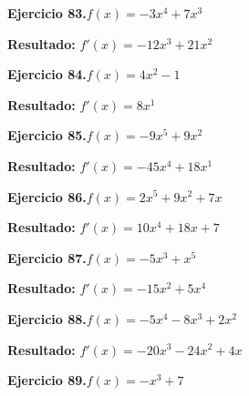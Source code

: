 \documentclass[10pt,a4paper]{article}
\begin{document}
\begin{ejbox}
\textbf{Ejercicio 83.}\quad $f(x) = -3x^{4} + 7x^{3}$
\end{ejbox}

\begin{solbox}
\textbf{Resultado:} \(\displaystyle f'(x) = -12x^{3} + 21x^{2}\)
\end{solbox}

\begin{ejbox}
\textbf{Ejercicio 84.}\quad $f(x) = 4x^{2} -1$
\end{ejbox}

\begin{solbox}
\textbf{Resultado:} \(\displaystyle f'(x) = 8x^{1}\)
\end{solbox}

\newpage
\begin{ejbox}
\textbf{Ejercicio 85.}\quad $f(x) = -9x^{5} +9x^{2}$
\end{ejbox}

\begin{solbox}
\textbf{Resultado:} \(\displaystyle f'(x) = -45x^{4} +18x^{1}\)
\end{solbox}

\begin{ejbox}
\textbf{Ejercicio 86.}\quad $f(x) = 2x^{5} +9x^2 +7x$
\end{ejbox}

\begin{solbox}
\textbf{Resultado:} \(\displaystyle f'(x) = 10x^{4} +18x +7\)
\end{solbox}

\begin{ejbox}
\textbf{Ejercicio 87.}\quad $f(x) = -5x^{3} + x^{5}$
\end{ejbox}

\begin{solbox}
\textbf{Resultado:} \(\displaystyle f'(x) = -15x^{2} + 5x^{4}\)
\end{solbox}

\newpage
\begin{ejbox}
\textbf{Ejercicio 88.}\quad $f(x) = -5x^4 -8x^3 +2x^2$
\end{ejbox}

\begin{solbox}
\textbf{Resultado:} \(\displaystyle f'(x) = -20x^3 -24x^2 +4x\)
\end{solbox}

\begin{ejbox}
\textbf{Ejercicio 89.}\quad $f(x) = -x^{3} +7$
\end{ejbox}
\end{document}
